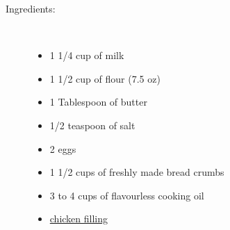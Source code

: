 \documentclass[11pt,letterpaper]{article}
\begin{document}
\begin{description}

\item[Ingredients:]\ \\
	\begin{itemize}
	\item 1 1/4 cup of milk
	\item 1 1/2 cup of flour (7.5 oz)
	\item 1 Tablespoon of butter
	\item 1/2 teaspoon of salt
	\item 2 eggs
	\item 1 1/2 cups of freshly made bread crumbs
	\item 3 to 4 cups of flavourless cooking oil
	\item \href{ChickenFilling.html}{chicken filling}
	\end{itemize}


\end{description}
\end{document}
